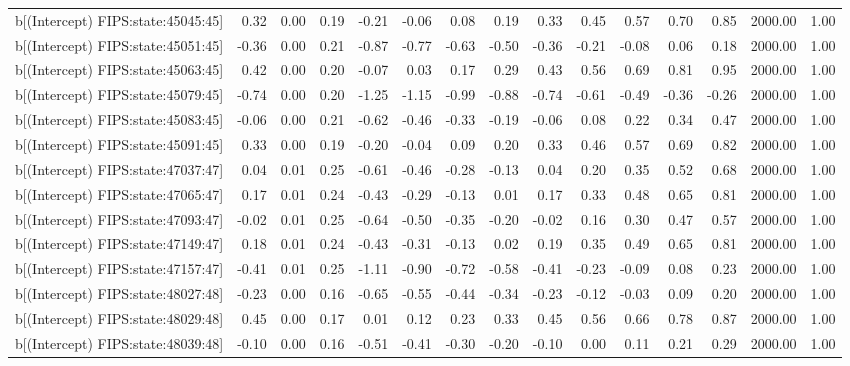 \begin{table}[ht]
\begin{tabular}{rrrrrrrrrrrrrrr}
  b[(Intercept) FIPS:state:45045:45] & 0.32 & 0.00 & 0.19 & -0.21 & -0.06 & 0.08 & 0.19 & 0.33 & 0.45 & 0.57 & 0.70 & 0.85 & 2000.00 & 1.00 \\ 
  b[(Intercept) FIPS:state:45051:45] & -0.36 & 0.00 & 0.21 & -0.87 & -0.77 & -0.63 & -0.50 & -0.36 & -0.21 & -0.08 & 0.06 & 0.18 & 2000.00 & 1.00 \\ 
  b[(Intercept) FIPS:state:45063:45] & 0.42 & 0.00 & 0.20 & -0.07 & 0.03 & 0.17 & 0.29 & 0.43 & 0.56 & 0.69 & 0.81 & 0.95 & 2000.00 & 1.00 \\ 
  b[(Intercept) FIPS:state:45079:45] & -0.74 & 0.00 & 0.20 & -1.25 & -1.15 & -0.99 & -0.88 & -0.74 & -0.61 & -0.49 & -0.36 & -0.26 & 2000.00 & 1.00 \\ 
  b[(Intercept) FIPS:state:45083:45] & -0.06 & 0.00 & 0.21 & -0.62 & -0.46 & -0.33 & -0.19 & -0.06 & 0.08 & 0.22 & 0.34 & 0.47 & 2000.00 & 1.00 \\ 
  b[(Intercept) FIPS:state:45091:45] & 0.33 & 0.00 & 0.19 & -0.20 & -0.04 & 0.09 & 0.20 & 0.33 & 0.46 & 0.57 & 0.69 & 0.82 & 2000.00 & 1.00 \\ 
  b[(Intercept) FIPS:state:47037:47] & 0.04 & 0.01 & 0.25 & -0.61 & -0.46 & -0.28 & -0.13 & 0.04 & 0.20 & 0.35 & 0.52 & 0.68 & 2000.00 & 1.00 \\ 
  b[(Intercept) FIPS:state:47065:47] & 0.17 & 0.01 & 0.24 & -0.43 & -0.29 & -0.13 & 0.01 & 0.17 & 0.33 & 0.48 & 0.65 & 0.81 & 2000.00 & 1.00 \\ 
  b[(Intercept) FIPS:state:47093:47] & -0.02 & 0.01 & 0.25 & -0.64 & -0.50 & -0.35 & -0.20 & -0.02 & 0.16 & 0.30 & 0.47 & 0.57 & 2000.00 & 1.00 \\ 
  b[(Intercept) FIPS:state:47149:47] & 0.18 & 0.01 & 0.24 & -0.43 & -0.31 & -0.13 & 0.02 & 0.19 & 0.35 & 0.49 & 0.65 & 0.81 & 2000.00 & 1.00 \\ 
  b[(Intercept) FIPS:state:47157:47] & -0.41 & 0.01 & 0.25 & -1.11 & -0.90 & -0.72 & -0.58 & -0.41 & -0.23 & -0.09 & 0.08 & 0.23 & 2000.00 & 1.00 \\ 
  b[(Intercept) FIPS:state:48027:48] & -0.23 & 0.00 & 0.16 & -0.65 & -0.55 & -0.44 & -0.34 & -0.23 & -0.12 & -0.03 & 0.09 & 0.20 & 2000.00 & 1.00 \\ 
  b[(Intercept) FIPS:state:48029:48] & 0.45 & 0.00 & 0.17 & 0.01 & 0.12 & 0.23 & 0.33 & 0.45 & 0.56 & 0.66 & 0.78 & 0.87 & 2000.00 & 1.00 \\ 
  b[(Intercept) FIPS:state:48039:48] & -0.10 & 0.00 & 0.16 & -0.51 & -0.41 & -0.30 & -0.20 & -0.10 & 0.00 & 0.11 & 0.21 & 0.29 & 2000.00 & 1.00 \\ 

\end{tabular}
\end{table}
